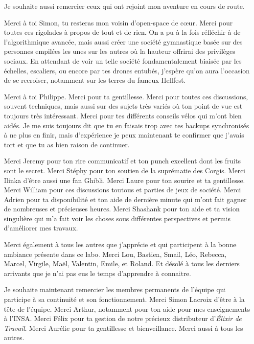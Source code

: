 
Je souhaite aussi remercier ceux qui ont rejoint mon aventure en cours de route.  

Merci à toi Simon, tu resteras mon voisin d'open-space de cœur. Merci pour toutes ces rigolades à propos de tout et de rien. On a pu à la fois réfléchir à de l'algorithmique avancée, mais aussi créer une société gymnastique basée sur des personnes empilées les unes sur les autres où la hauteur offrirai des privilèges sociaux. En attendant de voir un telle société fondamentalement biaisée par les échelles, escaliers, ou encore par tes drones entubés, j'espère qu'on aura l'occasion de se recroiser, notamment sur les terres du fameux Hellfest.

Merci à toi Philippe. Merci pour ta gentillesse. Merci pour toutes ces discussions, souvent techniques, mais aussi sur des sujets très variés où ton point de vue est toujours très intéressant. Merci pour tes différents conseils vélos qui m'ont bien aidés. 
Je me suis toujours dit que tu en faisais trop avec tes backups synchronisés à ne plus en finir, mais d'expérience je peux maintenant te confirmer que j'avais tort et que tu as bien raison de continuer.   

Merci Jeremy pour ton rire communicatif et ton punch excellent dont les fruits sont le secret. 
Merci Stéphy pour ton soutien de la suprématie des Corgis. 
Merci Ilinka d'être aussi une fan Ghibli. 
Merci Laure pour ton sourire et ta gentillesse.
Merci William pour ces discussions toutous et parties de jeux de société. 
Merci Adrien pour ta disponibilité et ton aide de dernière minute qui m'ont fait gagner de nombreuses et précieuses heures.
Merci Shashank pour ton aide et ta vision singulière qui m'a fait voir les choses sous différentes perspectives et permis d'améliorer mes travaux. 

Merci également à tous les autres que j'apprécie et qui participent à la bonne ambiance présente dans ce labo. 
Merci Lou, Bastien, Smail, Léo, Rebecca, Marcel, Virgile, Maël, Valentin, Emile, et Roland. 
Et désolé à tous les derniers arrivants que je n'ai pas eus le temps d'apprendre à connaitre. 



Je souhaite maintenant remercier les membres permanents de l'équipe qui participe à sa continuité et son fonctionnement.
Merci Simon Lacroix d'être à la tête de l'équipe.
Merci Arthur, notamment pour ton aide pour mes enseignements à l'INSA. 
Merci Félix pour ta gestion de notre précieux distributeur d'\textit{Élixir de Travail}.
Merci Aurélie pour ta gentillesse et bienveillance. 
Merci aussi à tous les autres.  


